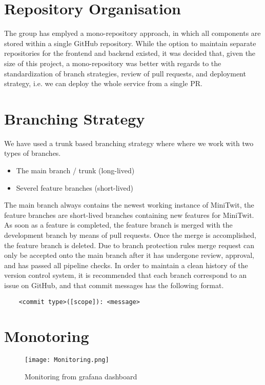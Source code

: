 \section{Repository Organisation}
The group has emplyed a mono-repository approach, in which all components are stored within a single GitHub repository. While the option to maintain separate repositories for the frontend and backend existed, it was decided that, given the size of this project, a mono-repository was better with regards to the standardization of branch strategies, review of pull requests, and deployment strategy, i.e. we can deploy the whole service from a single PR.

\section{Branching Strategy}
We have used a trunk based branching strategy where where we work with two types of branches.

\begin{itemize}
    \item The main branch / trunk (long-lived)
    \item Severel feature branches (short-lived)
\end{itemize}

The main branch always contains the newest working instance of MiniTwit, the feature branches are short-lived branches containing new features for MiniTwit. As soon as a feature is completed, the feature branch is merged with the development branch by means of pull requests. Once the merge is accomplished, the feature branch is deleted. Due to branch protection rules merge request can only be accepted onto the main branch after it has undergone review, approval, and has passed all pipeline checks. In order to maintain a clean history of the version control system, it is recommended that each branch correspond to an issue on GitHub, and that commit messages has the following format.

\begin{verbatim}
    <commit type>([scope]): <message>
\end{verbatim}

\section{Monotoring}

\begin{figure}[H]
    \centering
    \texttt{[image: Monitoring.png]}
    \caption{Monitoring from grafana dashboard}
    \label{fig:Minitwit_monitoring}
\end{figure}

